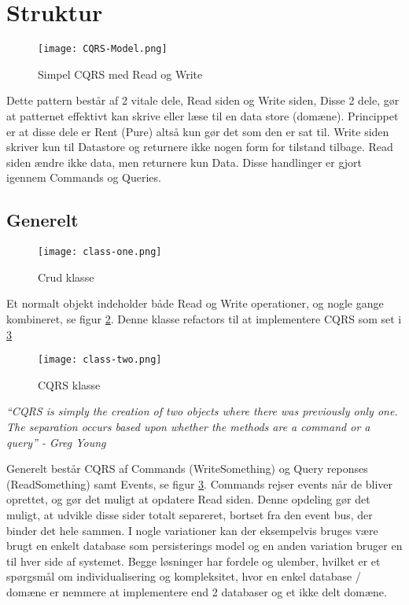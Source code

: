 \section{Struktur}

\begin{figure}[H]
	\center
	\texttt{[image: CQRS-Model.png]}
	\caption{Simpel CQRS med Read og Write}
	\label{fig:cqrs-model}
\end{figure}

Dette pattern består af 2 vitale dele, Read siden og Write siden, Disse 2 dele, gør at patternet effektivt kan skrive eller læse til en data store (domæne). Princippet er at disse dele er Rent (Pure) altså kun gør det som den er sat til. Write siden skriver kun til Datastore og returnere ikke nogen form for tilstand tilbage. Read siden ændre ikke data, men returnere kun Data. Disse handlinger er gjort igennem Commands og Queries.

\subsection{Generelt}

\begin{figure}[H]
	\center
	\texttt{[image: class-one.png]}
	\caption{Crud klasse}
	\label{fig:class-one}
\end{figure}

Et normalt objekt indeholder både Read og Write operationer, og nogle gange kombineret, se figur \ref{fig:class-one}. Denne klasse refactors til at implementere CQRS som set i \ref{fig:class-two} \newline


\begin{figure}[H]
	\center
	\texttt{[image: class-two.png]}
	\caption{CQRS klasse}
	\label{fig:class-two}
\end{figure}

\textit{``CQRS is simply the creation of two objects where there was previously only one. The separation occurs based upon whether the methods are a command or a query'' - Greg Young}

Generelt består CQRS af Commands (WriteSomething) og Query reponses (ReadSomething) samt Events, se figur \ref{fig:class-two}. Commands rejser events når de bliver oprettet, og gør det muligt at opdatere Read siden. Denne opdeling gør det muligt, at udvikle disse sider totalt separeret, bortset fra den event bus, der binder det hele sammen. I nogle variationer kan der eksempelvis bruges være brugt en enkelt database som persisterings model og en anden variation bruger en til hver side af systemet. Begge løsninger har fordele og ulember, hvilket er et spørgsmål om individualisering og kompleksitet, hvor en enkel database / domæne er nemmere at implementere end 2 databaser og et ikke delt domæne.

